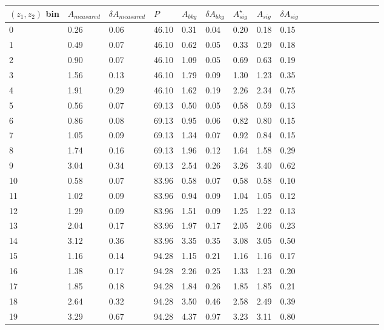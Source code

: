 \begin{table}[H]\footnotesize
\centering
\begin{tabular}{|l|l|l|l|l|l|l|l|l|l|l|l|l|l|l|l|l|l|}
\\ \hline
$(z_1,z_2)$ bin & $A_{measured}$ & $\delta A_{measured}$ & $P$ &  $A_{bkg}$ & $\delta A_{bkg}$ & $A_{sig}^{\star}$ & $ A_{sig}$  & $\delta A_{sig}$ \\ \hline
0 & 0.26 & 0.06 & 46.10 & 0.31 & 0.04 & 0.20 & 0.18 & 0.15 \\ \hline 
1 & 0.49 & 0.07 & 46.10 & 0.62 & 0.05 & 0.33 & 0.29 & 0.18 \\ \hline 
2 & 0.90 & 0.07 & 46.10 & 1.09 & 0.05 & 0.69 & 0.63 & 0.19 \\ \hline 
3 & 1.56 & 0.13 & 46.10 & 1.79 & 0.09 & 1.30 & 1.23 & 0.35 \\ \hline 
4 & 1.91 & 0.29 & 46.10 & 1.62 & 0.19 & 2.26 & 2.34 & 0.75 \\ \hline 
5 & 0.56 & 0.07 & 69.13 & 0.50 & 0.05 & 0.58 & 0.59 & 0.13 \\ \hline 
6 & 0.86 & 0.08 & 69.13 & 0.95 & 0.06 & 0.82 & 0.80 & 0.15 \\ \hline 
7 & 1.05 & 0.09 & 69.13 & 1.34 & 0.07 & 0.92 & 0.84 & 0.15 \\ \hline 
8 & 1.74 & 0.16 & 69.13 & 1.96 & 0.12 & 1.64 & 1.58 & 0.29 \\ \hline 
9 & 3.04 & 0.34 & 69.13 & 2.54 & 0.26 & 3.26 & 3.40 & 0.62 \\ \hline 
10 & 0.58 & 0.07 & 83.96 & 0.58 & 0.07 & 0.58 & 0.58 & 0.10 \\ \hline 
11 & 1.02 & 0.09 & 83.96 & 0.94 & 0.09 & 1.04 & 1.05 & 0.12 \\ \hline 
12 & 1.29 & 0.09 & 83.96 & 1.51 & 0.09 & 1.25 & 1.22 & 0.13 \\ \hline 
13 & 2.04 & 0.17 & 83.96 & 1.97 & 0.17 & 2.05 & 2.06 & 0.23 \\ \hline 
14 & 3.12 & 0.36 & 83.96 & 3.35 & 0.35 & 3.08 & 3.05 & 0.50 \\ \hline 
15 & 1.16 & 0.14 & 94.28 & 1.15 & 0.21 & 1.16 & 1.16 & 0.17 \\ \hline 
16 & 1.38 & 0.17 & 94.28 & 2.26 & 0.25 & 1.33 & 1.23 & 0.20 \\ \hline 
17 & 1.85 & 0.18 & 94.28 & 1.84 & 0.26 & 1.85 & 1.85 & 0.21 \\ \hline 
18 & 2.64 & 0.32 & 94.28 & 3.50 & 0.46 & 2.58 & 2.49 & 0.39 \\ \hline 
19 & 3.29 & 0.67 & 94.28 & 4.37 & 0.97 & 3.23 & 3.11 & 0.80 \\ \hline 

\end{tabular}
\end{table}
